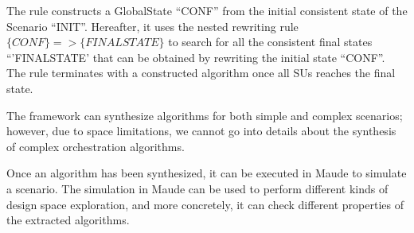The rule constructs a GlobalState ``CONF'' from the initial consistent state of the Scenario ``INIT''.
Hereafter, it uses the nested rewriting rule $\{CONF\} => \{ FINALSTATE\} $ to search for all the consistent final states ``'FINALSTATE' that can be obtained by rewriting the initial state ``CONF''.
The rule terminates with a constructed algorithm once all SUs reaches the final state.

The framework can synthesize algorithms for both simple and complex scenarios; however, due to space limitations, we cannot go into details about the synthesis of complex orchestration algorithms.

Once an algorithm has been synthesized, it can be executed in Maude to simulate a scenario.
The simulation in Maude can be used to perform different kinds of design space exploration, and more concretely, it can check different properties of the extracted algorithms.